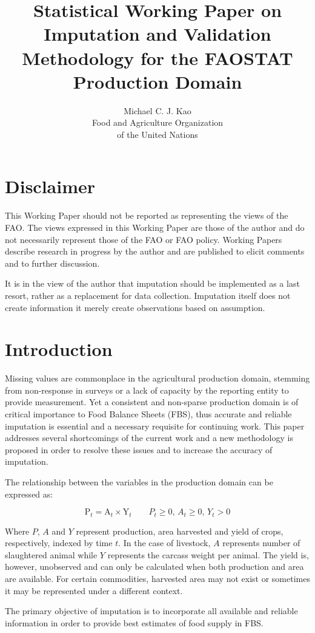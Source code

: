 \documentclass[nojss]{jss}\usepackage[]{graphicx}\usepackage[]{color}
\title{\bf Statistical Working Paper on Imputation and Validation
  Methodology for the FAOSTAT Production Domain}
\author{Michael C. J. Kao\\ Food and Agriculture Organization \\ of
  the United Nations}
\begin{document}
\section*{Disclaimer}
This Working Paper should not be reported as representing the views of
the FAO. The views expressed in this Working Paper are those of the
author and do not necessarily represent those of the FAO or FAO
policy. Working Papers describe research in progress by the author and
are published to elicit comments and to further discussion.

It is in the view of the author that imputation should be implemented
as a last resort, rather as a replacement for data
collection. Imputation itself does not create information it merely
create observations based on assumption. 

\section{Introduction}
Missing values are commonplace in the agricultural production domain,
stemming from non-response in surveys or a lack of capacity by the
reporting entity to provide measurement. Yet a consistent and
non-sparse production domain is of critical importance to Food Balance
Sheets (FBS), thus accurate and reliable imputation is essential and a
necessary requisite for continuing work. This paper addresses several
shortcomings of the current work and a new methodology is proposed in
order to resolve these issues and to increase the accuracy of
imputation.

The relationship between the variables in the production domain can be
expressed as:

\begin{equation}
  \label{eq:identity}
  \text{P}_t = \text{A}_t \times \text{Y}_t \quad\quad P_t \ge 0,\, A_t
  \ge 0,\, Y_t > 0
\end{equation}


Where $P$, $A$ and $Y$ represent production, area harvested and yield
of crops, respectively, indexed by time $t$. In the case of livestock,
$A$ represents number of slaughtered animal while $Y$ represents the
carcass weight per animal. The yield is, however, unobserved and can
only be calculated when both production and area are available. For
certain commodities, harvested area may not exist or sometimes it may
be represented under a different context.


The primary objective of imputation is to incorporate all
available and reliable information in order to provide best estimates of
food supply in FBS.
\end{document}
